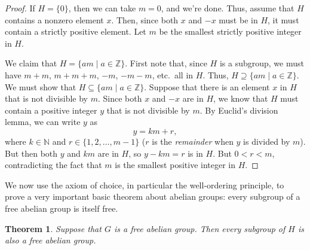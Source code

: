 \documentclass[a4paper]{memoir}
\newtheorem{theorem}{Theorem}[section]
\theoremstyle{definition}
\newcommand{\bb}{\mathbb}
\begin{document}
\begin{proof}
  If $H = \{0\}$, then we can take $m = 0$, and we're done. Thus, assume that $H$ contains a 
  nonzero element $x$. Then, since both $x$ and $-x$ must be in $H$, it must contain a 
  strictly positive element. Let $m$ be the smallest strictly positive integer in $H$. 
  
  We claim that $H = \{am \mid a \in \bb{Z}\}$. First note that, since $H$ is a subgroup, 
  we must have $m + m$, $m + m + m$, $-m$, $-m-m$, etc.\ all in $H$. Thus, $H \supseteq \{am
  \mid a \in \bb{Z}\}$. We must show that $H \subseteq \{am \mid a \in \bb{Z}\}$. Suppose that 
  there is an element $x$ in $H$ that is not divisible by $m$. Since both $x$ and $-x$ are in 
  $H$, we know that $H$ must contain a positive integer $y$ that is not divisible by $m$. 
  By Euclid's division lemma, we can write $y$ as 
  \[
    y = km + r,
  \]
  where $k \in \bb{N}$ and $r \in \{1, 2, \ldots, m-1\}$ ($r$ is the \emph{remainder} when 
  $y$ is divided by $m$). But then both $y$ and $km$ are in $H$, so $y - km = r$ is in $H$. 
  But $0 < r < m$, contradicting the fact that $m$ is the smallest positive integer in $H$.
\end{proof}

We now use the axiom of choice, in particular the well-ordering principle, 
to prove a very important basic theorem about abelian groups: 
every subgroup of a free abelian group is itself free.

\begin{theorem}
  Suppose that $G$ is a free abelian group. Then every subgroup of $H$ is also a free abelian group.
\end{theorem}
\end{document}
